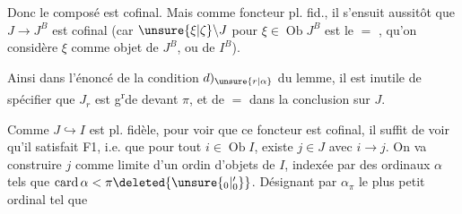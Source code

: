 
Donc le composé
est cofinal. Mais comme 
 foncteur  pl. fid., 
il s'ensuit aussitôt que $J\longrightarrow J^B$
est cofinal (car $\unsure{\xi|\zeta}\backslash J$ pour $\xi\in\operatorname{Ob}J^B$
est le $=$ , qu'on considère $\xi$ comme
objet de $J^B$, ou de $I^B$).

Ainsi dans l'énoncé de la condition
$d)_{\unsure{r|\alpha}}$ du lemme, il est inutile de
spécifier que $J_r$ est g\textsuperscript{r}de devant $\pi$,
et de $=$ dans la conclusion sur $J$.

Comme $J\hookrightarrow I$ est pl. fidèle,
pour voir que ce foncteur est cofinal,
il suffit de voir qu'il satisfait F1,
i.e. que pour tout $i\in\operatorname{Ob} I$,
existe $j\in J$ avec $i\longrightarrow j$. On
va construire $j$ comme limite d'un
 ordin d'objets  de $I$,
indexée par des ordinaux $\alpha$ tels que
$\operatorname{card}\alpha<\pi\deleted{\unsure{{}_0|{}'_0}}$.
 Désignant
par $\alpha_\pi$ le plus petit ordinal tel que
